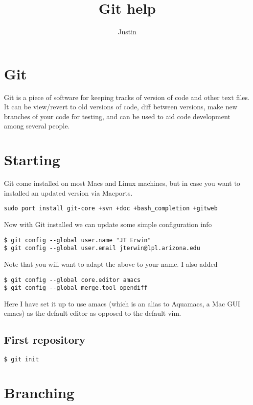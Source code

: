 \documentclass[12pt]{article}
\begin{document}
\title{Git help}
\author{Justin}
\date{}
\maketitle

\section{Git}

Git is a piece of software for keeping tracks of version of code and other text files. It can be view/revert to old versions of code, diff between versions, make new branches of your code for testing, and can be used to aid code development among several people.

\section{Starting}

Git come installed on most Macs and Linux machines, but in case you want to installed an updated version via Macports.
\begin{lstlisting}[style=Bash]
sudo port install git-core +svn +doc +bash_completion +gitweb
\end{lstlisting}


Now with Git installed we can update some simple configuration info 
\begin{lstlisting}[style=Bash]
$ git config --global user.name "JT Erwin"
$ git config --global user.email jterwin@lpl.arizona.edu
\end{lstlisting}
Note that you will want to adapt the above to your name. I also added
\begin{lstlisting}[style=Bash]
$ git config --global core.editor amacs
$ git config --global merge.tool opendiff
\end{lstlisting}
Here I have set it up to use amacs (which is an alias to Aquamacs, a Mac GUI emacs) as the default editor as opposed to the default vim.

\subsection{First repository}
\begin{lstlisting}[style=Bash]
$ git init
\end{lstlisting}


\section{Branching}
\end{document}
